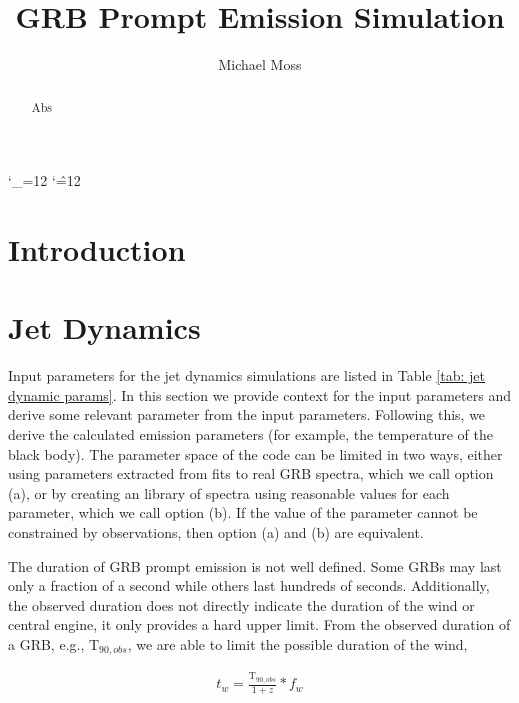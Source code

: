 \documentclass[linenumbers,twocolumn]{aastex631}
\def\upsubscripts{\catcode`\_=12 } \def\normalsubscripts{\catcode`\_=8 }
\def\upsupscripts{\catcode`\^=12 } \def\normalsupscripts{\catcode`\^=7 }
\begin{document}
\upsubscripts
\upsupscripts

\title{GRB Prompt Emission Simulation}

\author{Michael Moss}




\begin{abstract}
Abs
\end{abstract}


\section{Introduction} \label{sec:intro}
\section{Jet Dynamics} \label{sec:jet dynamics}

Input parameters for the jet dynamics simulations are listed in Table \ref{tab: jet dynamic params}. In this section we provide context for the input parameters and derive some relevant parameter from the input parameters. Following this, we derive the calculated emission parameters (for example, the temperature of the black body). The parameter space of the code can be limited in two ways, either using parameters extracted from fits to real GRB spectra, which we call option (a), or by creating an library of spectra using reasonable values for each parameter, which we call option (b). If the value of the parameter cannot be constrained by observations, then option (a) and (b) are equivalent.

The duration of GRB prompt emission is not well defined. Some GRBs may last only a fraction of a second while others last hundreds of seconds. Additionally, the observed duration does not directly indicate the duration of the wind or central engine, it only provides a hard upper limit. From the observed duration of a GRB, e.g., T$_{90,obs}$, we are able to limit the possible duration of the wind, 

\begin{align}
	t_w = \frac{\text{T}_{90,obs}}{1+z} * f_w
\end{align}
\end{document}
